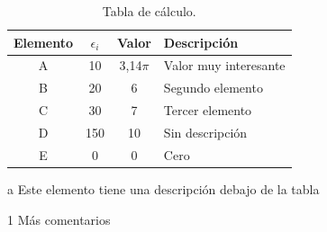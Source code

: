 \begin{appendixs}
	\enabletablerowcolor[2] %
	\begin{table}[H]
		\begin{threeparttable}
		\centering
		\caption{Tabla de cálculo.}
		\begin{tabular}{cccC{4cm}}
			\hline
			\textbf{Elemento} & $\epsilon_i$ & \textbf{Valor} & \textbf{Descripción} \bigstrut \\
			\hline
			A     & 10    & 3,14$\pi$ & Valor muy interesante \\
			B     & 20    & 6 & Segundo elemento \\
			C     & 30    & 7 & Tercer elemento \\
			D     & 150    & 10 & Sin descripción \\
			E     & 0    & 0 & Cero \\
			\hline
			\end{tabular}
		\begin{tablenotes}
			\item[a] Este elemento tiene una descripción debajo de la tabla
			\item[1] Más comentarios
		\end{tablenotes}
		\end{threeparttable}
		\label{tab:anexo-1}
	\end{table}
	\disabletablerowcolor %



\end{appendixs}